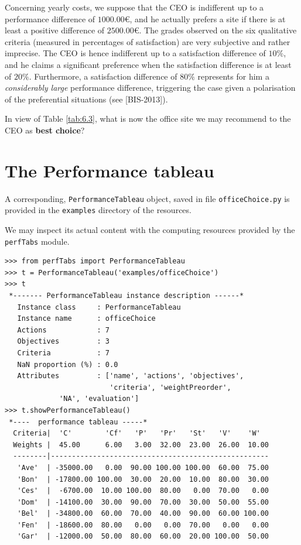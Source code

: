 Concerning yearly costs, we suppose that the CEO is indifferent up to a performance difference of $1000.00$€, and he actually prefers a site if there is at least a positive difference of $2500.00$€. The grades observed on the six qualitative criteria (measured in percentages of satisfaction) are very subjective and rather imprecise. The CEO is hence indifferent up to a satisfaction difference of $10\%$, and he claims a significant preference when the satisfaction difference is at least of $20\%$.  Furthermore, a satisfaction difference of $80\%$ represents for him a \emph{considerably large} performance difference, triggering the case given a polarisation of the preferential situations (see [BIS-2013]). 

In view of Table \ref{tab:6.3}, what is now the office site we may recommend to the CEO as \textbf{best choice}?

\section{The \Digraph Performance tableau}
\label{sec:6.2}


A corresponding, \texttt{PerformanceTableau} object, saved in file \texttt{officeChoice.py} is provided in the \texttt{examples} directory of the \Digraph resources. 

We may inspect its actual content with the computing resources provided by the \texttt{perfTabs} module.

\begin{lstlisting}[caption={Inspecting the \texttt{officeChoice} performance tableau},label=list:6.1]
>>> from perfTabs import PerformanceTableau
>>> t = PerformanceTableau('examples/officeChoice')
>>> t
 *------- PerformanceTableau instance description ------*
   Instance class     : PerformanceTableau
   Instance name      : officeChoice
   Actions            : 7
   Objectives         : 3
   Criteria           : 7
   NaN proportion (%) : 0.0
   Attributes         : ['name', 'actions', 'objectives',
                         'criteria', 'weightPreorder',
			 'NA', 'evaluation']
>>> t.showPerformanceTableau()
 *----  performance tableau -----*
  Criteria|  'C'        'Cf'   'P'   'Pr'   'St'   'V'    'W'   
  Weights |  45.00      6.00   3.00  32.00  23.00  26.00  10.00    
  --------|----------------------------------------------------
   'Ave'  | -35000.00   0.00  90.00 100.00 100.00  60.00  75.00  
   'Bon'  | -17800.00 100.00  30.00  20.00  10.00  80.00  30.00  
   'Ces'  |  -6700.00  10.00 100.00  80.00   0.00  70.00   0.00  
   'Dom'  | -14100.00  30.00  90.00  70.00  30.00  50.00  55.00  
   'Bel'  | -34800.00  60.00  70.00  40.00  90.00  60.00 100.00  
   'Fen'  | -18600.00  80.00   0.00   0.00  70.00   0.00   0.00  
   'Gar'  | -12000.00  50.00  80.00  60.00  20.00 100.00  50.00  
\end{lstlisting}

